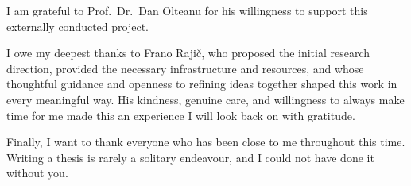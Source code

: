 I am grateful to Prof.\ Dr.\ Dan Olteanu for his willingness to support this
externally conducted project.

I owe my deepest thanks to Frano Rajič, who proposed the initial research
direction, provided the necessary infrastructure and resources, and whose
thoughtful guidance and openness to refining ideas together shaped this work
in every meaningful way. His kindness, genuine care, and willingness to always
make time for me made this an experience I will look back on with gratitude.

Finally, I want to thank everyone who has been close to me throughout this time.
Writing a thesis is rarely a solitary endeavour, and I could not have done it
without you.